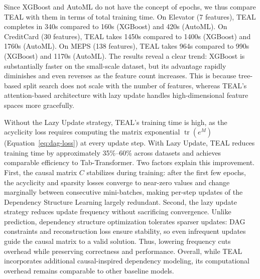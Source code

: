 \documentclass[conference]{IEEEtran}
\newcommand{\syfix}[1]{{\color{black}#1}}
\newcommand{\syne}[1]{{\color{black}#1}}
\newcommand{\syic}[1]{{\color{black}#1}}
\newcommand{\syone}[1]{{\color{black}#1}}
\newcommand*{\ourmodel}{TEAL}
\begin{document}
\syfix{
Since XGBoost and AutoML do not have the concept of epochs, we thus compare \ourmodel{} with them in terms of total training time. 
On Elevator (7 features), \ourmodel{} completes in 340s compared to 160s (XGBoost) and 420s (AutoML). On CreditCard (30 features), \ourmodel{} takes 1450s compared to 1400s (XGBoost) and 1760s (AutoML). On MEPS (138 features), \ourmodel{} takes 964s compared to 990s (XGBoost) and 1170s (AutoML). The results reveal a clear trend: XGBoost is substantially faster on the small-scale dataset, but its advantage rapidly diminishes and even reverses as the feature count increases. 
This is because tree-based split search does not scale with the number of features\cite{r:xgboost}, whereas \ourmodel{}'s attention-based architecture with lazy update handles high-dimensional feature spaces more gracefully.
}


\syfix{Without the Lazy Update strategy, \ourmodel{}'s training time is high, as the acyclicity loss requires computing the matrix exponential $\operatorname{tr}(e^M)$ (Equation~\eqref{eq:dag-loss}) at every update step. 
With Lazy Update, \ourmodel{} reduces training time by approximately 35\%--60\% across datasets and achieves comparable efficiency to Tab-Transformer. }
\syne{Two factors explain this improvement. First, the causal matrix $C$ stabilizes during training: after the first few epochs, the acyclicity and sparsity losses converge to near-zero values and change marginally between consecutive mini-batches, making per-step updates of the \syic{Dependency Structure Learning} largely redundant.}
\syne{Second, the lazy update strategy reduces update frequency without sacrificing convergence. Unlike prediction, \syic{dependency structure} optimization tolerates sparser updates: DAG constraints and reconstruction loss ensure stability, so even infrequent updates guide the causal matrix to a valid solution. Thus, lowering frequency cuts overhead while preserving correctness and performance.}
\syfix{Overall, while \ourmodel{} incorporates additional \syone{causal-inspired dependency} modeling, its computational overhead remains comparable to other baseline models.}
\end{document}

